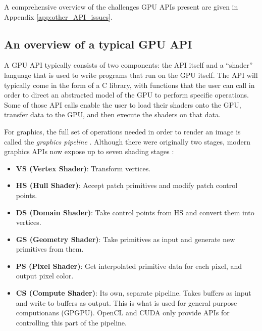\documentclass[a4paper,12pt,twoside,openright]{report}
\begin{document}
A comprehensive overview of the challenges GPU APIs present are given in
Appendix \ref{app:other_API_issues}.

\subsection{An overview of a typical GPU API}

\label{sec:graphics_api_overview}

A GPU API typically consists of two components: the API itself and a ``shader''
language that is used to write programs that run on the GPU itself. The API
will typically come in the form of a C library, with functions that the user
can call in order to direct an abstracted model of the GPU to perform specific
operations. Some of those API calls enable the user to load their shaders onto
the GPU, transfer data to the GPU, and then execute the shaders on that data.

For graphics, the full set of operations needed in order to render an image is
called the \textit{graphics pipeline} \cite{TripThroughGraphicsPipeline1}.
Although there were originally two stages, modern graphics APIs now expose up
to seven shading stages \cite{TripThroughGraphicsPipeline3}:

\begin{itemize}

    \item \textbf{VS (Vertex Shader)}: Transform vertices.

    \item \textbf{HS (Hull Shader)}: Accept patch primitives and modify patch
    control points.

    \item \textbf{DS (Domain Shader)}: Take control points from HS and convert
    them into vertices.

    \item \textbf{GS (Geometry Shader)}: Take primitives as input and generate
    new primitives from them.

    \item \textbf{PS (Pixel Shader)}: Get interpolated primitive data for each
    pixel, and output pixel color.

    \item \textbf{CS (Compute Shader)}: Its own, separate pipeline. Takes
    buffers as input and write to buffers as output. This is what is used for
    general purpose computionans (GPGPU). OpenCL and CUDA only provide APIs for
    controlling this part of the pipeline.

\end{itemize}
\end{document}
